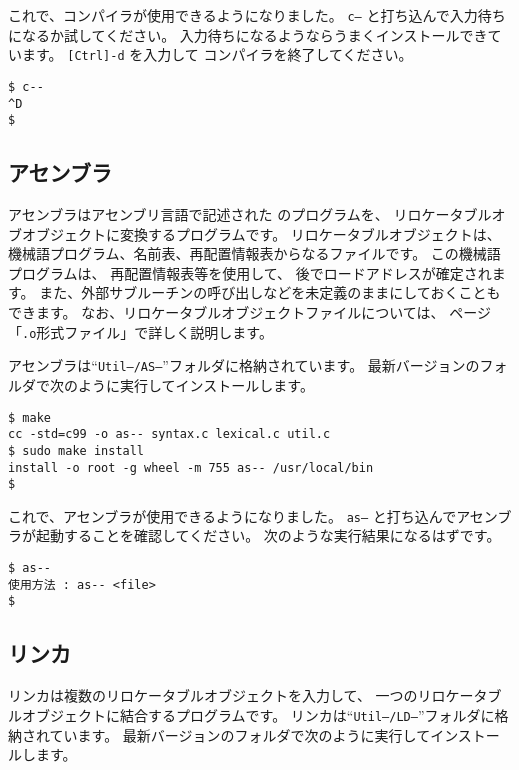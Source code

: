これで、\cmm コンパイラが使用できるようになりました。
{\tt c--} と打ち込んで入力待ちになるか試してください。
入力待ちになるようならうまくインストールできています。
{\tt [Ctrl]-d} を入力して \cmm コンパイラを終了してください。

\begin{mylist}
\begin{verbatim}
$ c--
^D
$
\end{verbatim}
\end{mylist}

\subsection{アセンブラ}

アセンブラはアセンブリ言語で記述された \tac のプログラムを、
リロケータブルオブオブジェクトに変換するプログラムです。
リロケータブルオブジェクトは、
機械語プログラム、名前表、再配置情報表からなるファイルです。
この機械語プログラムは、
再配置情報表等を使用して、
後でロードアドレスが確定されます。
また、外部サブルーチンの呼び出しなどを未定義のままにしておくこともできます。
なお、リロケータブルオブジェクトファイルについては、
\pageref{app:oformat}ページ「\verb/.o/形式ファイル」で詳しく説明します。

アセンブラは``{\tt Util--/AS--}''フォルダに格納されています。
最新バージョンのフォルダで次のように実行してインストールします。

\begin{mylist}
\begin{verbatim}
$ make
cc -std=c99 -o as-- syntax.c lexical.c util.c
$ sudo make install
install -o root -g wheel -m 755 as-- /usr/local/bin
$
\end{verbatim}
\end{mylist}

これで、\tac アセンブラが使用できるようになりました。
{\tt as--} と打ち込んでアセンブラが起動することを確認してください。
次のような実行結果になるはずです。

\begin{mylist}
\begin{verbatim}
$ as--
使用方法 : as-- <file>
$
\end{verbatim}
\end{mylist}

\subsection{リンカ}

リンカは複数のリロケータブルオブジェクトを入力して、
一つのリロケータブルオブジェクトに結合するプログラムです。
リンカは``{\tt Util--/LD--}''フォルダに格納されています。
最新バージョンのフォルダで次のように実行してインストールします。

